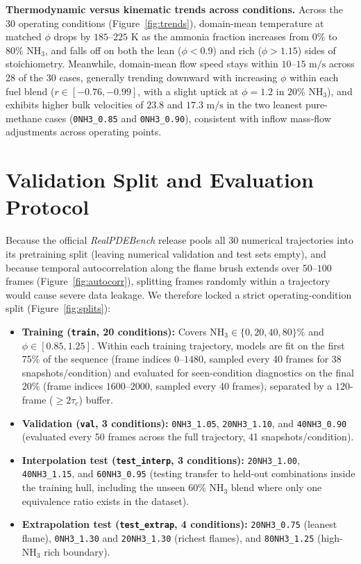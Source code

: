 \documentclass[11pt,letterpaper]{article}
\begin{document}
\textbf{Thermodynamic versus kinematic trends across conditions.} Across the 30 operating conditions (Figure~\ref{fig:trends}), domain-mean temperature at matched $\phi$ drops by $185\text{--}225\text{ K}$ as the ammonia fraction increases from $0\%$ to $80\%\text{ NH}_3$, and falls off on both the lean ($\phi < 0.9$) and rich ($\phi > 1.15$) sides of stoichiometry. Meanwhile, domain-mean flow speed stays within $10\text{--}15\text{ m/s}$ across 28 of the 30 cases, generally trending downward with increasing $\phi$ within each fuel blend ($r \in [-0.76, -0.99]$, with a slight uptick at $\phi=1.2$ in $20\%\text{ NH}_3$), and exhibits higher bulk velocities of $23.8$ and $17.3\text{ m/s}$ in the two leanest pure-methane cases (\texttt{0NH3\_0.85} and \texttt{0NH3\_0.90}), consistent with inflow mass-flow adjustments across operating points.

\section{Validation Split and Evaluation Protocol}

Because the official \textit{RealPDEBench} release pools all 30 numerical trajectories into its pretraining split (leaving numerical validation and test sets empty), and because temporal autocorrelation along the flame brush extends over $50\text{--}100$ frames (Figure~\ref{fig:autocorr}), splitting frames randomly within a trajectory would cause severe data leakage. We therefore locked a strict operating-condition split (Figure~\ref{fig:splits}):
\begin{itemize}
    \item \textbf{Training (\texttt{train}, 20 conditions):} Covers $\text{NH}_3 \in \{0, 20, 40, 80\}\%$ and $\phi \in [0.85, 1.25]$. Within each training trajectory, models are fit on the first 75\% of the sequence (frame indices $0\text{--}1480$, sampled every 40 frames for 38 snapshots/condition) and evaluated for seen-condition diagnostics on the final 20\% (frame indices $1600\text{--}2000$, sampled every 40 frames), separated by a $120$-frame ($\ge 2\tau_c$) buffer.
    \item \textbf{Validation (\texttt{val}, 3 conditions):} \texttt{0NH3\_1.05}, \texttt{20NH3\_1.10}, and \texttt{40NH3\_0.90} (evaluated every 50 frames across the full trajectory, 41 snapshots/condition).
    \item \textbf{Interpolation test (\texttt{test\_interp}, 3 conditions):} \texttt{20NH3\_1.00}, \texttt{40NH3\_1.15}, and \texttt{60NH3\_0.95} (testing transfer to held-out combinations inside the training hull, including the unseen $60\%\text{ NH}_3$ blend where only one equivalence ratio exists in the dataset).
    \item \textbf{Extrapolation test (\texttt{test\_extrap}, 4 conditions):} \texttt{20NH3\_0.75} (leanest flame), \texttt{0NH3\_1.30} and \texttt{20NH3\_1.30} (richest flames), and \texttt{80NH3\_1.25} (high-$\text{NH}_3$ rich boundary).
\end{itemize}
\end{document}
